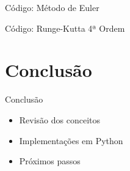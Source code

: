 \documentclass[11pt]{beamer}
\numberwithin{equation}{section}
\begin{document}
\begin{frame}{Código: Método de Euler}
\footnotesize
\end{frame}

\begin{frame}{Código: Runge-Kutta 4ª Ordem}
\footnotesize
\end{frame}

\section{Conclusão}
\begin{frame}{Conclusão}
\begin{itemize}
\item Revisão dos conceitos
\item Implementações em Python
\item Próximos passos
\end{itemize}
\end{frame}
\end{document}
